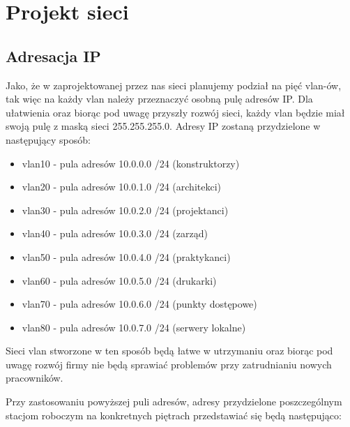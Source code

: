 \documentclass[a4paper, 12pt]{article}
\begin{document}
\section{Projekt sieci}

\subsection{Adresacja IP}
Jako, że w zaprojektowanej przez nas sieci planujemy podział na pięć vlan-ów, tak więc na każdy vlan należy przeznaczyć osobną pulę adresów IP. Dla ułatwienia oraz biorąc pod uwagę przyszły rozwój sieci, każdy vlan będzie miał swoją pulę z maską sieci 255.255.255.0. Adresy IP zostaną przydzielone w następujący sposób:

\begin{itemize}
\item vlan10 - pula adresów 10.0.0.0 /24 (konstruktorzy) 
\item vlan20 - pula adresów 10.0.1.0 /24 (architekci)
\item vlan30 - pula adresów 10.0.2.0 /24 (projektanci)
\item vlan40 - pula adresów 10.0.3.0 /24 (zarząd)
\item vlan50 - pula adresów 10.0.4.0 /24 (praktykanci)
\item vlan60 - pula adresów 10.0.5.0 /24 (drukarki)
\item vlan70 - pula adresów 10.0.6.0 /24 (punkty dostępowe)
\item vlan80 - pula adresów 10.0.7.0 /24 (serwery lokalne)
\end{itemize}

Sieci vlan stworzone w ten sposób będą łatwe w utrzymaniu oraz biorąc pod uwagę rozwój firmy nie będą sprawiać problemów przy zatrudnianiu nowych pracowników.

Przy zastosowaniu powyższej puli adresów, adresy przydzielone poszczególnym stacjom roboczym na konkretnych piętrach przedstawiać się będą następująco:
\end{document}
